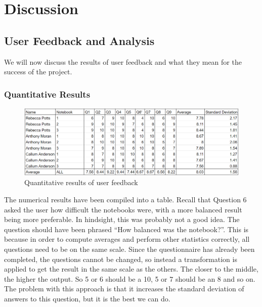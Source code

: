 \chapter{Discussion}
\label{chapter4}


\section{User Feedback and Analysis}

We will now discuss the results of user feedback and what they mean for the success of the project.

\subsection{Quantitative Results}

\begin{figure}[h]
\centering
\includegraphics[width=\textwidth]{./images/misc/testing-results}
\caption{Quantitative results of user feedback}
\label{fig:user-feedback}
\end{figure}

The numerical results have been compiled into a table. Recall that Question 6 asked the user how difficult the notebooks were, with a more balanced result being more preferable. In hindsight, this was probably not a good idea. The question should have been phrased ``How balanced was the notebook?''. This is because in order to compute averages and perform other statistics correctly, all questions need to be on the same scale. Since the questionnaire has already been completed, the questions cannot be changed, so instead a transformation is applied to get the result in the same scale as the others. The closer to the middle, the higher the output. So 5 or 6 should be a 10, 5 or 7 should be an 8 and so on. The problem with this approach is that it increases the standard deviation of answers to this question, but it is the best we can do.

